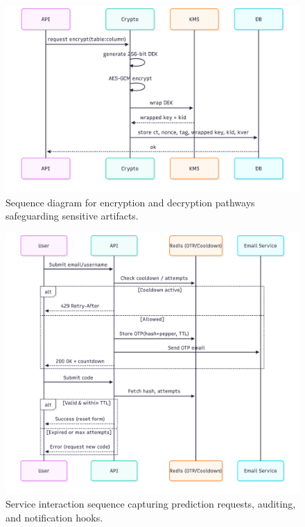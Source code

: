 \documentclass[12pt]{article}
\begin{document}
\begin{figure}[t]
  \centering
  \includegraphics[width=0.9\linewidth]{encryptiondecryption_sequence.png}
  \caption{Sequence diagram for encryption and decryption pathways safeguarding sensitive artifacts.}
  \label{fig:enc_sequence}
\end{figure}

\begin{figure}[t]
  \centering
  \includegraphics[width=0.9\linewidth]{sequence_of_interactions.png}
  \caption{Service interaction sequence capturing prediction requests, auditing, and notification hooks.}
  \label{fig:sequence_interactions}
\end{figure}
\end{document}
